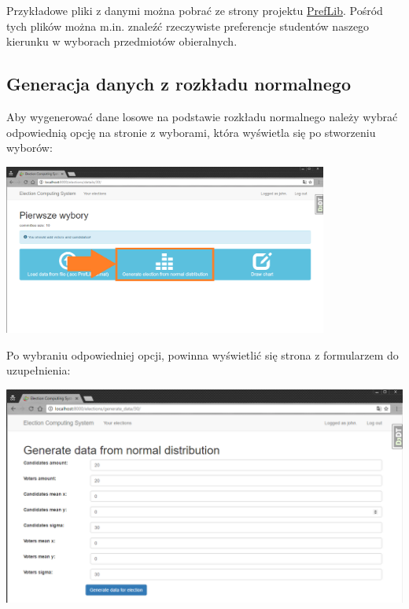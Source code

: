 \documentclass[pdflatex,11pt]{../aghdoc_version2}
\begin{document}
Przykładowe pliki z danymi można pobrać ze strony projektu \href{http://www.preflib.org/data/packs/index.php#soc}{PrefLib}. Pośród tych plików można m.in. znaleźć rzeczywiste preferencje studentów naszego kierunku w wyborach przedmiotów obieralnych.

\subsection{Generacja danych z rozkładu normalnego}
\label{subsec:generowaniedanych}

Aby wygenerować dane losowe na podstawie rozkładu normalnego należy wybrać odpowiednią opcję na stronie z wyborami, która wyświetla się po stworzeniu wyborów: \\

\begin{center}
\includegraphics[width=0.8\textwidth]{pics/generate_election_button.png}
\end{center}

\newpage
Po wybraniu odpowiedniej opcji, powinna wyświetlić się strona z formularzem do uzupełnienia: \\

\begin{center}
\includegraphics[width=1.0\textwidth]{pics/generate-distribution.png}
\end{center}
\end{document}
